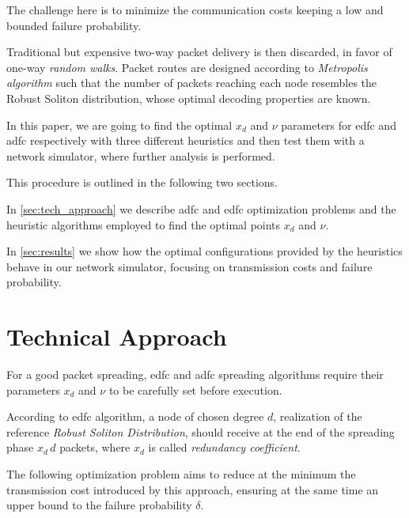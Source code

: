 \documentclass[12pt,journal,draftclsnofoot,onecolumn]{IEEEtran}
\begin{document}
The challenge here is to minimize the communication costs keeping a low and bounded failure probability.

Traditional but expensive \mbox{two-way} packet delivery is then discarded, in favor of \mbox{one-way} \emph{random walks}.
Packet routes are designed according to \emph{Metropolis algorithm} such that the number of packets reaching each node resembles the Robust Soliton distribution, whose optimal decoding properties are known.\cite{Luby}

In this paper, we are going to find the optimal $x_d$ and $\nu$ parameters for \gls{edfc} and \gls{adfc} respectively with three different heuristics and then test them with a network simulator, where further analysis is performed.

\smallbreak
This procedure is outlined in the following two sections.

In \autoref{sec:tech_approach} we describe \gls{adfc} and \gls{edfc} optimization problems and the heuristic algorithms employed to find the optimal points $x_d$ and $\nu$.

In \autoref{sec:results} we show how the optimal configurations provided by the heuristics behave in our network simulator, focusing on transmission costs and failure probability.

\section{Technical Approach}
\label{sec:tech_approach}
For a good packet spreading, \gls{edfc} and \gls{adfc} spreading algorithms require their parameters $x_d$ and $\nu$ to be carefully set before execution.

\smallbreak
According to \gls{edfc} algorithm, a node of chosen degree $d$, realization of the reference \emph{Robust Soliton Distribution}, should receive at the end of the spreading phase $x_d \, d$ packets, where $x_d$ is called \emph{redundancy coefficient}.

The following optimization problem aims to reduce at the minimum the transmission cost introduced by this approach, ensuring at the same time an upper bound to the failure probability $\delta$.\cite{Lin2007}
\end{document}

